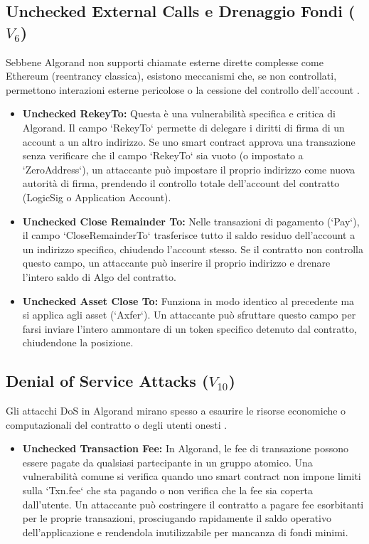 \subsection{Unchecked External Calls e Drenaggio Fondi (\texorpdfstring{$V_6$}{V6})}
Sebbene Algorand non supporti chiamate esterne dirette complesse come Ethereum (reentrancy classica), esistono meccanismi che, se non controllati, permettono interazioni esterne pericolose o la cessione del controllo dell'account \cite{boi2025}.

\begin{itemize}
    \item \textbf{Unchecked RekeyTo:} Questa è una vulnerabilità specifica e critica di Algorand. Il campo `RekeyTo` permette di delegare i diritti di firma di un account a un altro indirizzo. Se uno smart contract approva una transazione senza verificare che il campo `RekeyTo` sia vuoto (o impostato a `ZeroAddress`), un attaccante può impostare il proprio indirizzo come nuova autorità di firma, prendendo il controllo totale dell'account del contratto (LogicSig o Application Account).
    
    \item \textbf{Unchecked Close Remainder To:} Nelle transazioni di pagamento (`Pay`), il campo `CloseRemainderTo` trasferisce tutto il saldo residuo dell'account a un indirizzo specifico, chiudendo l'account stesso. Se il contratto non controlla questo campo, un attaccante può inserire il proprio indirizzo e drenare l'intero saldo di Algo del contratto.
    
    \item \textbf{Unchecked Asset Close To:} Funziona in modo identico al precedente ma si applica agli asset (`Axfer`). Un attaccante può sfruttare questo campo per farsi inviare l'intero ammontare di un token specifico detenuto dal contratto, chiudendone la posizione.
\end{itemize}

\subsection{Denial of Service Attacks (\texorpdfstring{$V_{10}$}{V10})}
Gli attacchi DoS in Algorand mirano spesso a esaurire le risorse economiche o computazionali del contratto o degli utenti onesti \cite{boi2025}.

\begin{itemize}
    \item \textbf{Unchecked Transaction Fee:} In Algorand, le fee di transazione possono essere pagate da qualsiasi partecipante in un gruppo atomico. Una vulnerabilità comune si verifica quando uno smart contract non impone limiti sulla `Txn.fee` che sta pagando o non verifica che la fee sia coperta dall'utente. Un attaccante può costringere il contratto a pagare fee esorbitanti per le proprie transazioni, prosciugando rapidamente il saldo operativo dell'applicazione e rendendola inutilizzabile per mancanza di fondi minimi.
\end{itemize}

